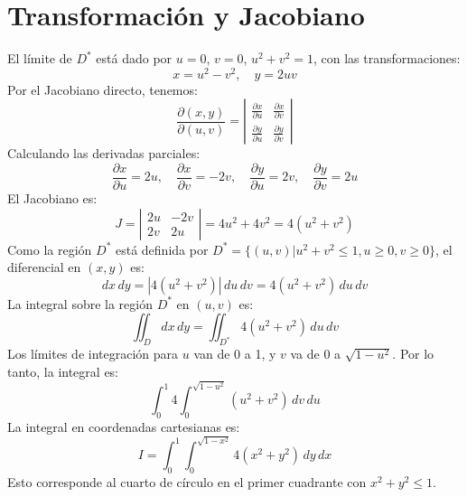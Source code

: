 \section*{Transformación y Jacobiano}


El límite de \( D^* \) está dado por \( u = 0 \), \( v = 0 \), \( u^2 + v^2 = 1 \), con las transformaciones:
\[
x = u^2 - v^2, \quad y = 2uv
\]
Por el Jacobiano directo, tenemos:
\[
\frac{\partial(x,y)}{\partial(u,v)} = \left| \begin{matrix} \frac{\partial x}{\partial u} & \frac{\partial x}{\partial v} \\ \frac{\partial y}{\partial u} & \frac{\partial y}{\partial v} \end{matrix} \right|
\]
Calculando las derivadas parciales:
\[
\frac{\partial x}{\partial u} = 2u, \quad \frac{\partial x}{\partial v} = -2v, \quad \frac{\partial y}{\partial u} = 2v, \quad \frac{\partial y}{\partial v} = 2u
\]
El Jacobiano es:
\[
J = \left| \begin{matrix} 2u & -2v \\ 2v & 2u \end{matrix} \right| = 4u^2 + 4v^2 = 4(u^2 + v^2)
\]
Como la región \( D^* \) está definida por \( D^* = \{(u,v) | u^2 + v^2 \leq 1, u \geq 0, v \geq 0 \} \), el diferencial en \( (x,y) \) es:
\[
dx\,dy = |4(u^2 + v^2)| \, du\,dv = 4(u^2 + v^2) \, du\,dv
\]
La integral sobre la región \( D^* \) en \( (u,v) \) es:
\[
\iint_D dx\,dy = \iint_{D^*} 4(u^2 + v^2) \, du\,dv
\]
Los límites de integración para \( u \) van de 0 a 1, y \( v \) va de 0 a \( \sqrt{1 - u^2} \). Por lo tanto, la integral es:
\[
\int_0^1 4 \int_0^{\sqrt{1-u^2}} (u^2 + v^2) \, dv \, du
\]
La integral en coordenadas cartesianas es:
\[
I = \int_0^1 \int_0^{\sqrt{1-x^2}} 4(x^2 + y^2) \, dy \, dx
\]
Esto corresponde al cuarto de círculo en el primer cuadrante con \(x^2 + y^2 \leq 1\).


